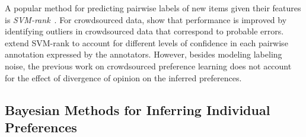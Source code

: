 A popular method for predicting pairwise labels of new items given their features is 
\emph{SVM-rank}~\citep{joachims2002optimizing}.
For crowdsourced data, \citet{fu2016robust} show that performance is improved by identifying outliers in crowdsourced data
that correspond to probable errors.
\citet{uchida2017entity} extend SVM-rank to account for different levels of confidence in each pairwise annotation expressed
by the annotators.
However, besides modeling labeling noise, 
the previous work on crowdsourced preference learning does not 
account for the effect of divergence of opinion on the inferred preferences.

\subsection{Bayesian Methods for Inferring Individual Preferences}

